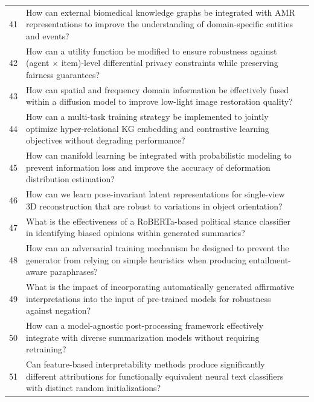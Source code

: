 \begin{longtable}{@{}p{0.5cm}p{7.2cm}p{2.5cm}@{}}
41 & How can external biomedical knowledge graphs be integrated with AMR representations to improve the understanding of domain-specific entities and events? & \cite{10.18653/v1/2021.acl-long.489} \\
42 & How can a utility function be modified to ensure robustness against (agent × item)-level differential privacy constraints while preserving fairness guarantees? & \cite{10.1609/aaai.v37i5.25721} \\
43 & How can spatial and frequency domain information be effectively fused within a diffusion model to improve low-light image restoration quality? & \cite{10.1609/aaai.v38i5.28273} \\
44 & How can a multi-task training strategy be implemented to jointly optimize hyper-relational KG embedding and contrastive learning objectives without degrading performance? & \cite{10.18653/v1/2024.findings-acl.171} \\
45 & How can manifold learning be integrated with probabilistic modeling to prevent information loss and improve the accuracy of deformation distribution estimation? & \cite{10.1609/aaai.v36i11.21637} \\
46 & How can we learn pose-invariant latent representations for single-view 3D reconstruction that are robust to variations in object orientation? & \cite{10.1609/aaai.v36i1.19920} \\
47 & What is the effectiveness of a RoBERTa-based political stance classifier in identifying biased opinions within generated summaries? & \cite{10.48550/arxiv.2402.00322} \\
48 & How can an adversarial training mechanism be designed to prevent the generator from relying on simple heuristics when producing entailment-aware paraphrases? & \cite{10.1609/aaai.v36i10.21376} \\
49 & What is the impact of incorporating automatically generated affirmative interpretations into the input of pre-trained models for robustness against negation? & \cite{10.18653/v1/2024.acl-short.55} \\
50 & How can a model-agnostic post-processing framework effectively integrate with diverse summarization models without requiring retraining? & \cite{10.18653/v1/2024.findings-acl.59} \\
51 & Can feature-based interpretability methods produce significantly different attributions for functionally equivalent neural text classifiers with distinct random initializations? & \cite{10.18653/v1/2021.findings-acl.327} \\

\end{longtable}
